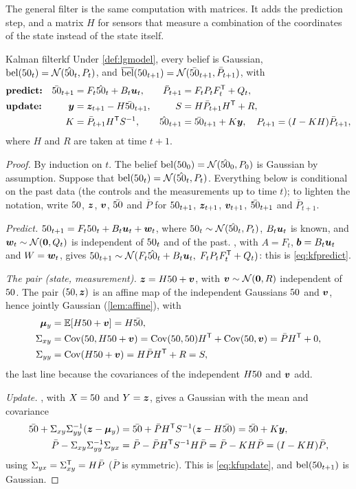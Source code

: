 The general filter is the same computation with matrices. It adds the
prediction step, and a matrix $H$ for sensors that measure a combination
of the coordinates of the state instead of the state itself.

\begin{theorem}{Kalman filter}{kf}
Under \cref{def:lgmodel}, every belief is Gaussian,
$\operatorname{bel}(50_t)=\mathcal{N}(\hat{50}_t,P_t)$, and $\overline{\operatorname{bel}}(50_{t+1})=
\mathcal{N}(\bar{50}_{t+1},\bar P_{t+1})$, with
\begin{align}
  &\textbf{predict:} & \bar{50}_{t+1}&=F_t\hat{50}_t+B_t\bm{u}_t, &
  \bar P_{t+1}&=F_tP_tF_t^{\mathsf{T}}+Q_t, \label{eq:kfpredict}\\
  &\textbf{update:} & \bm{y}&=\bm{z}_{t+1}-H\bar{50}_{t+1}, & S&=H\bar P_{t+1}H^{\mathsf{T}}+R,
  \notag\\
  && K&=\bar P_{t+1}H^{\mathsf{T}} S^{-1}, & \hat{50}_{t+1}&=\bar{50}_{t+1}+K\bm{y},\quad
  P_{t+1}=(I-KH)\bar P_{t+1}, \label{eq:kfupdate}
\end{align}
where $H$ and $R$ are taken at time $t+1$.
\end{theorem}

\begin{proof}
By induction on $t$. The belief $\operatorname{bel}(50_0)=\mathcal{N}(\hat{50}_0,P_0)$ is
Gaussian by assumption. Suppose that $\operatorname{bel}(50_t)=\mathcal{N}(\hat{50}_t,P_t)$.
Everything below is conditional on the past data (the controls and the
measurements up to time $t$); to lighten the notation, write $50$, $\bm{z}$,
$\bm{v}$, $\bar{50}$ and $\bar P$ for $50_{t+1}$, $\bm{z}_{t+1}$, $\bm{v}_{t+1}$,
$\bar{50}_{t+1}$ and $\bar P_{t+1}$.

\emph{Predict.} $50_{t+1}=F_t50_t+B_t\bm{u}_t+\bm{w}_t$, where $50_t\sim
\mathcal{N}(\hat{50}_t,P_t)$, $B_t\bm{u}_t$ is known, and $\bm{w}_t\sim\mathcal{N}(\bm{0},
Q_t)$ is independent of $50_t$ and of the past. , with
$A=F_t$, $\bm{b}=B_t\bm{u}_t$ and $W=\bm{w}_t$, gives
$50_{t+1}\sim\mathcal{N}(F_t\hat{50}_t+B_t\bm{u}_t,\;F_tP_tF_t^{\mathsf{T}}+Q_t)$: this is
\eqref{eq:kfpredict}.

\emph{The pair (state, measurement).} $\bm{z}=H50+\bm{v}$, with
$\bm{v}\sim\mathcal{N}(\bm{0},R)$ independent of $50$. The pair $(50,\bm{z})$ is an
affine map of the independent Gaussians $50$ and $\bm{v}$, hence jointly
Gaussian (\cref{lem:affine}), with
\begin{align*}
  \bm{\mu}_y&=\mathbb{E}[H50+\bm{v}]=H\bar{50},\\
  \Sigma_{xy}&=\operatorname{Cov}(50,H50+\bm{v})=\operatorname{Cov}(50,50)H^{\mathsf{T}}+\operatorname{Cov}(50,\bm{v})
  =\bar PH^{\mathsf{T}}+0,\\
  \Sigma_{yy}&=\operatorname{Cov}(H50+\bm{v})=H\bar PH^{\mathsf{T}}+R=S,
\end{align*}
the last line because the covariances of the independent $H50$ and $\bm{v}$
add.

\emph{Update.} , with $X=50$ and $Y=\bm{z}$, gives a
Gaussian with the mean and covariance
\begin{align*}
  \bar{50}+\Sigma_{xy}\Sigma_{yy}^{-1}(\bm{z}-\bm{\mu}_y)
  &=\bar{50}+\bar PH^{\mathsf{T}} S^{-1}(\bm{z}-H\bar{50})=\bar{50}+K\bm{y},\\
  \bar P-\Sigma_{xy}\Sigma_{yy}^{-1}\Sigma_{yx}
  &=\bar P-\bar PH^{\mathsf{T}} S^{-1}H\bar P=\bar P-KH\bar P=(I-KH)\bar P,
\end{align*}
using $\Sigma_{yx}=\Sigma_{xy}^{\mathsf{T}}=H\bar P$ ($\bar P$ is symmetric). This
is \eqref{eq:kfupdate}, and $\operatorname{bel}(50_{t+1})$ is Gaussian.
\end{proof}

